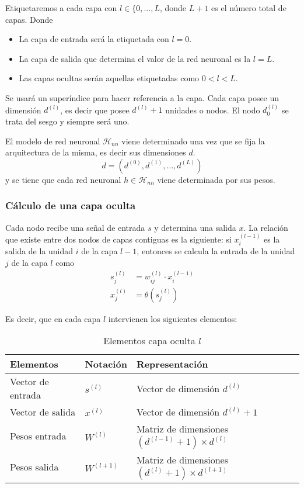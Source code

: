 Etiquetaremos a cada capa con $l \in \{0, \ldots, L$, donde $L+1$ es el número total de capas.  Donde 

\begin{itemize}
    \item La capa de entrada será la etiquetada con $l = 0$.
    \item La capa de salida que determina el valor de la red neuronal es la $l=L$.
    \item Las capas ocultas serán aquellas etiquetadas como $0 < l <L.$
\end{itemize}

Se usará un superíndice para hacer referencia a la capa. 
Cada capa posee un dimensión $d^{(l)}$, es decir que posee
$d^{(l)} + 1$ unidades o nodos. El nodo $d_0^{(l)}$ se trata del sesgo y siempre será uno. 

El modelo de red neuronal $\mathcal{H}_{n n}$ viene determinado una vez que se fija la arquitectura de la misma, es decir sus dimensiones $d$. 
\begin{equation}
    d = (d^{(0)}, d^{(1)}, \ldots, d^{(L)})
\end{equation}
y se tiene que cada red neuronal $h \in \mathcal{H}_{n n}$
viene determinada por sus pesos. 

\subsubsection*{Cálculo de una capa oculta}  
Cada nodo recibe una señal de entrada $s$ y determina una salida $x$. 
La relación que existe entre dos nodos de capas contiguas es la siguiente: si $x_i^{(l-1)}$ es la salida de la unidad $i$ de la capa $l-1$, 
entonces se calcula la entrada de la unidad $j$ de la capa $l$ como 
\begin{align}
    s_j^{(l)} &= w_{i j}^{(l)} \cdot x_i^{(l-1)}  \\
    x_j^{(l)} &= \theta(s_j^{(l)})
\end{align}

Es decir, que en cada capa $l$ intervienen los siguientes elementos:  
\begin{table}[h]
    \begin{center}
    \begin{tabular}{| l | l | l |}
    \hline
    Elementos & Notación & Representación 
    \\ \hline
    Vector de entrada & $s^{(l)}$ &  Vector de dimensión $d^{(l)}$ \\
    Vector de salida & $x^{(l)}$ &  Vector de dimensión $d^{(l)}+ 1$ \\
    Pesos entrada & $W^{(l)}$ & Matriz de dimensiones $(d^{(l-1)}+1) \times d^{(l)}$ \\
    Pesos salida & $W^{(l+1)}$ 
    & Matriz de dimensiones $(d^{(l)}+1) \times d^{(l+1)}$ \\
    \hline
    \end{tabular}
    \caption{Elementos capa oculta $l$}
    \label{tab:rrnn_elementos_capa_oculta}
    \end{center}
\end{table}

